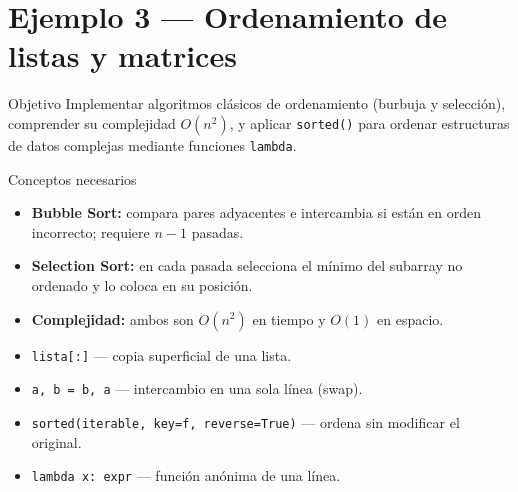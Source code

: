 \documentclass[12pt,a4paper]{article}
\begin{document}
\newpage
\section{Ejemplo 3 — Ordenamiento de listas y matrices}
\label{sec:ejemplo3}

\begin{objetivobox}{Objetivo}
Implementar algoritmos clásicos de ordenamiento (burbuja y selección),
comprender su complejidad $O(n^2)$, y aplicar \texttt{sorted()} para ordenar
estructuras de datos complejas mediante funciones \texttt{lambda}.
\end{objetivobox}

\vspace{0.6em}
\begin{conceptobox}{Conceptos necesarios}
\begin{itemize}
  \item \textbf{Bubble Sort:} compara pares adyacentes e intercambia si están
        en orden incorrecto; requiere $n-1$ pasadas.
  \item \textbf{Selection Sort:} en cada pasada selecciona el mínimo del subarray
        no ordenado y lo coloca en su posición.
  \item \textbf{Complejidad:} ambos son $O(n^2)$ en tiempo y $O(1)$ en espacio.
  \item \texttt{lista[:]} — copia superficial de una lista.
  \item \texttt{a, b = b, a} — intercambio en una sola línea (swap).
  \item \texttt{sorted(iterable, key=f, reverse=True)} — ordena sin modificar el original.
  \item \texttt{lambda x: expr} — función anónima de una línea.
\end{itemize}
\end{conceptobox}
\end{document}

